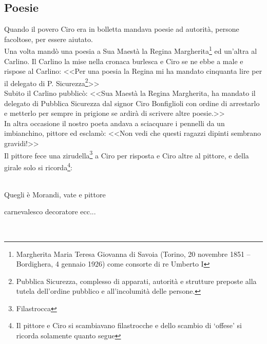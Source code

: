 \subsection{Poesie}
Quando il povero Ciro era in bolletta mandava poesie ad autorità, persone facoltose, per essere aiutato.\\
\indent Una volta mandò una poesia a Sua Maestà la Regina Margherita\footnote{Margherita Maria Teresa Giovanna di Savoia (Torino, 20 novembre 1851 – Bordighera, 4 gennaio 1926) come consorte di re Umberto I} ed un'altra al Carlino. Il Carlino la mise nella cronaca burlesca e Ciro se ne ebbe a male e rispose al Carlino: <<Per una poesia la Regina mi ha mandato cinquanta lire per il delegato di P. Sicurezza\footnote{Pubblica Sicurezza, complesso di apparati, autorità e strutture preposte alla tutela dell'ordine pubblico e all'incolumità delle persone.}>>\\
\indent Subito il Carlino pubblicò: <<Sua Maestà la Regina Margherita, ha mandato il delegato di Pubblica Sicurezza dal signor Ciro Bonfiglioli con ordine di arrestarlo e metterlo per sempre in prigione se ardirà di scrivere altre poesie.>>\\
\indent In altra occasione il nostro poeta andava a sciacquare i pennelli da un imbianchino, pittore ed esclamò: <<Non vedi che questi ragazzi dipinti sembrano gravidi!>>\\
\indent Il pittore fece una zirudella\footnote{Filastrocca} a Ciro per risposta e Ciro altre al pittore, e della girale solo si ricorda\footnote{Il pittore e Ciro si scambiavano filastrocche e dello scambio di `offese' si ricorda solamente quanto segue}:\\\\
\textcal \Huge
	\centerline{Quegli è Morandi, vate e pittore}
	\centerline{carnevalesco decoratore ecc...} 
\normalfont \normalsize
\\

